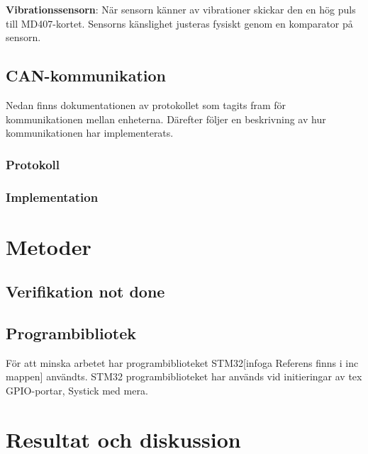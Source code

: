 \documentclass{article}
\begin{document}
\textbf{Vibrationssensorn}: När sensorn känner av vibrationer skickar den en hög puls till MD407-kortet. Sensorns känslighet justeras fysiskt genom en komparator på sensorn.

\subsection{CAN-kommunikation}
\label{can}
Nedan finns dokumentationen av protokollet som tagits fram för 
kommunikationen mellan enheterna. Därefter följer en beskrivning 
av hur kommunikationen har implementerats.
\subsubsection{Protokoll}

\subsubsection{Implementation}

\section{Metoder}
\subsection{Verifikation not done}
\subsection{Programbibliotek}
För att minska arbetet har programbiblioteket STM32[infoga Referens finns i inc mappen]
användts. 
STM32 programbiblioteket har används vid initieringar av tex GPIO-portar, Systick med mera.

\section{Resultat och diskussion} %
\end{document}
